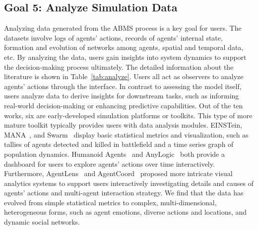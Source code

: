 \subsection{Goal 5: Analyze Simulation Data}
Analyzing data generated from the ABMS process is a key goal for users.
The datasets involve logs of agents' actions, records of agents' internal state, formation and evolution of networks among agents, spatial and temporal data, etc.
By analyzing the data, users gain insights into system dynamics to support the decision-making process ultimately.
The detailed information about the literature is shown in Table~\ref{tab:analyze}.
Users all act as observers to analyze agents' actions through the interface.
In contrast to assessing the model itself, users analyze data to derive insights for downstream tasks, such as informing real-world decision-making or enhancing predictive capabilities.
Out of the ten works, six are early-developed simulation platforms or toolkits. 
This type of more mature toolkit typically provides users with data analysis modules.
EINSTein, MANA~\cite{berryman2008review}, and Swarm~\cite{minar1996swarm} display basic statistical metrics and visualization, such as tallies of agents detected and killed in battlefield and a time series graph of population dynamics.
Humanoid Agents~\cite{wang2023humanoidagentsplatformsimulating} and AnyLogic~\cite{doi:https://doi.org/10.1002/9781118762745.ch12} both provide a dashboard for users to explore agents' actions over time interactively.
Furthermore, AgentLens~\cite{10520238} and AgentCoord~\cite{cui2024chatlawmultiagentcollaborativelegal} proposed more intricate visual analytics systems to support users interactively investigating details and causes of agents' actions and multi-agent interaction strategy.
We find that the data has evolved from simple statistical metrics to complex, multi-dimensional, heterogeneous forms, such as agent emotions, diverse actions and locations, and dynamic social networks.


